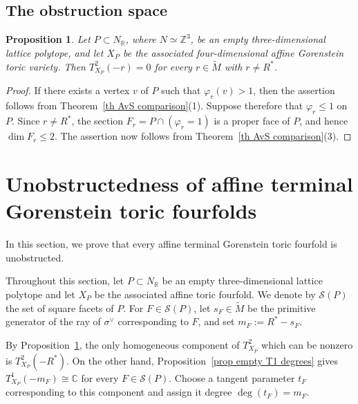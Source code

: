 \documentclass[11pt]{amsart}
\numberwithin{equation}{section}
\theoremstyle{plain}
\newtheorem{proposition}[theorem]{Proposition}
\theoremstyle{definition}
\newcommand{\0}{$0$-mutable}
\newcommand{\RR}{\ensuremath{\mathbb{R}}}
\newcommand{\CC}{\ensuremath{\mathbb{C}}}
\newcommand{\ZZ}{\ensuremath{\mathbb{Z}}}
\renewcommand{\1}{$1$-rigid}
\renewcommand{\0}{$0$-mutable}
\begin{document}
\subsection{The obstruction space}




\begin{proposition}\label{th gen}
Let \(P\subset N_{\RR}\), where \(N\simeq\ZZ^3\), be an empty
three-dimensional lattice polytope, and let \(X_P\) be the associated
four-dimensional affine Gorenstein toric variety. Then
$
T^2_{X_P}(-r)=0
$
for every \(r\in\widetilde M\) with \(r\neq R^*\).
\end{proposition}

\begin{proof}
If there exists a vertex \(v\) of \(P\) such that
\(\varphi_r(v)>1\), then the assertion follows from
Theorem~\ref{th AvS comparison}(1). Suppose therefore that
\(\varphi_r\leq1\) on \(P\). Since \(r\neq R^*\), the section
$
F_r=P\cap(\varphi_r=1)
$
is a proper face of \(P\), and hence \(\dim F_r\leq2\). The assertion
now follows from Theorem~\ref{th AvS comparison}(3).
\end{proof}























\section{Unobstructedness of affine terminal Gorenstein toric fourfolds}
\label{sec 5 unobstructedness}

In this section, we prove that every affine terminal Gorenstein toric
fourfold is unobstructed.

{
Throughout this section, let \(P\subset N_{\RR}\) be an empty
three-dimensional lattice polytope and let \(X_P\) be the associated
affine toric fourfold. We denote by \(\mathcal S(P)\) the set of square
facets of \(P\). For \(F\in\mathcal S(P)\), let
\(s_F\in\widetilde M\) be the primitive generator of the ray of
\(\sigma^\vee\) corresponding to \(F\), and set
\(m_F:=R^*-s_F\).}

By Proposition~\ref{th gen}, the only homogeneous component of
\(T^2_{X_P}\) which can be nonzero is \(T^2_{X_P}(-R^*)\).
On the other hand, Proposition~\ref{prop empty T1 degrees} gives
\(T^1_{X_P}(-m_F)\cong\CC\) for every \(F\in\mathcal S(P)\).
Choose a tangent parameter \(t_F\) corresponding to this component and
assign it degree \(\deg(t_F)=m_F\).
\end{document}
